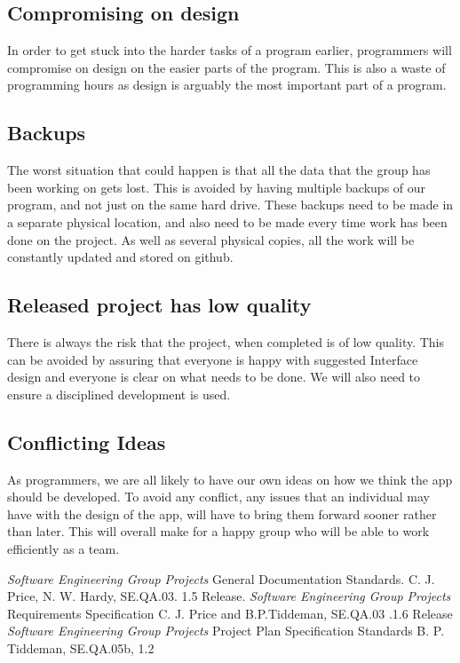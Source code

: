 \documentclass{project}
\begin{document}
\subsection{Compromising on design}
In order to get stuck into the harder tasks of a program earlier, programmers will compromise on design on the easier parts of the program. This is also a waste of programming hours as design is arguably the most important part of a program.
 
\subsection{Backups}
The worst situation that could happen is that all the data that the group has been working on gets lost. This is avoided by having multiple backups of our program,
and not just on the same hard drive. These backups need to be made in a separate physical location, and also need to be made every time work has been done on the project. As well as several physical copies, all the work will be constantly updated and stored on github.

\subsection{Released project has low quality}
There is always the risk that the project, when completed is of low quality. 
This can be avoided by assuring that everyone is happy with suggested Interface design and everyone is clear on what needs to be done. 
We will also need to ensure a disciplined development is used.

\subsection{Conflicting Ideas}
As programmers, we are all likely to have our own ideas on how we think the app should be developed. 
To avoid any conflict, any issues that an individual may have with the design of the app, 
will have to bring them forward sooner rather than later. This will overall make for a happy group who will be able to work efficiently as a team.

\clearpage

\begin{thebibliography}{5}
 \emph{Software Engineering Group Projects}
General Documentation Standards.
C. J. Price, N. W. Hardy, SE.QA.03. 1.5 Release.
 \emph{Software Engineering Group Projects}
Requirements Specification
C. J. Price and B.P.Tiddeman, SE.QA.03 .1.6 Release
 \emph{Software Engineering Group Projects}
Project Plan Specification Standards
B. P. Tiddeman, SE.QA.05b, 1.2
\end{thebibliography}
\end{document}
